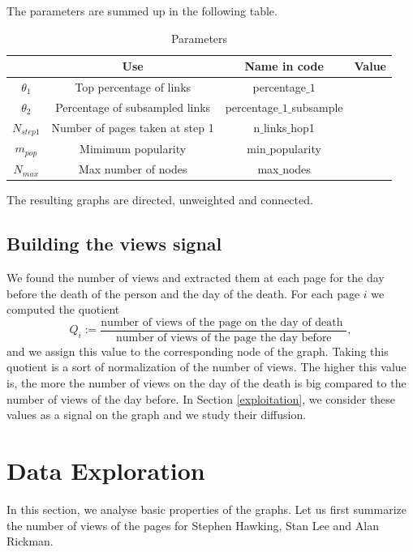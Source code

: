 \documentclass[conference]{IEEEtran}
\begin{document}
\medskip 

The parameters are summed up in the following table. 

\begin{table}[htbp]
\caption{Parameters}
\begin{center}
\begin{tabular}{|c|c|c|c|}
\hline
 & Use & Name in code & Value \\
\hline
$\theta_1$& Top  percentage of links  & percentage$\_1$ & \\
\hline
$\theta_2$& Percentage of subsampled links &  percentage$\_1\_$subsample &  \\
\hline
$N_{step1}$  &  Number of pages taken at step 1   & n$\_$links$\_$hop1  &  \\
\hline
$m_{pop}$  & Mimimum popularity  & min$\_$popularity & \\
\hline
$N_{max}$  &  Max number of nodes & max$\_$nodes&  \\
\hline
\end{tabular}
\end{center}
\end{table}

The resulting graphs are directed, unweighted and connected. 

\subsection{Building the views signal}
We found the number of views and extracted them at each page for the day before the death of the person and the day of the death. 
For each page $i$  we computed the quotient  \[Q_i:=\frac{\text{number of views of the page on the day of death }}{\text{number of views of the page the day before}},\] and we assign this value to the corresponding node of the graph. Taking this quotient is a sort of normalization of the number of views. The higher this value is, the more the number of views on the day of the death is big compared to the number of views of the day before.  In Section \ref{exploitation}, we consider these values as a signal on the graph and we study their diffusion. 

\section{Data Exploration} \label{exploration}

In this section, we analyse basic properties of the graphs. Let us first summarize the number of views of the pages for Stephen Hawking, Stan Lee and Alan Rickman. 
\end{document}
